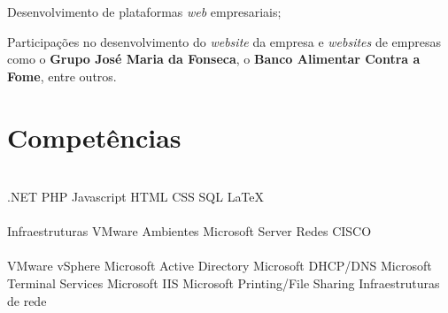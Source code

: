 \documentclass[letterpaper]{deedy-resume} %
\begin{document}
\begin{minipage}[t]{0.66\textwidth}
\sectionspace


\begin{tightitemize}
	\item Desenvolvimento de plataformas \textit{web} empresariais;
	\item Participações no desenvolvimento do \textit{website} da empresa e \textit{websites} de empresas como o \textbf{Grupo José Maria da Fonseca}, o \textbf{Banco Alimentar Contra a Fome}, entre outros.
\end{tightitemize}

\sectionspace

\section{Competências}

\\
.NET \textbullet{} PHP \textbullet{} Javascript \textbullet{} HTML \textbullet{} CSS \textbullet{} SQL \textbullet{} \LaTeX{}\\
\\
Infraestruturas VMware \textbullet{} Ambientes Microsoft Server \textbullet{} Redes CISCO\\
\\
VMware vSphere \textbullet{} Microsoft Active Directory \textbullet{} Microsoft DHCP/DNS \textbullet{} Microsoft Terminal Services \textbullet{} Microsoft IIS \textbullet{} Microsoft Printing/File Sharing \textbullet{} Infraestruturas de rede

\end{minipage} %








\end{document}

